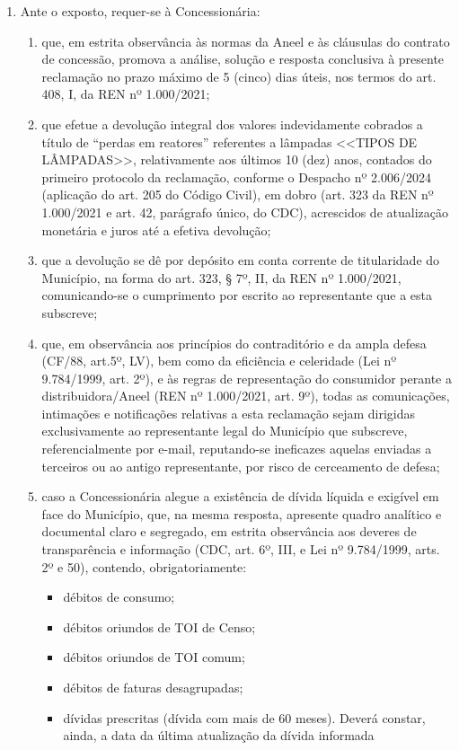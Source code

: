 \begin{enumerate}[resume]

\item
Ante o exposto, requer-se à Concessionária: 

\begin{enumerate}
    \item que, em estrita observância às normas da Aneel e às cláusulas do contrato de concessão, promova a análise, solução e resposta conclusiva à presente reclamação no prazo máximo de 5 (cinco) dias úteis, nos termos do art. 408, I, da REN nº 1.000/2021;
    \item  que efetue a devolução integral dos valores indevidamente cobrados a título de “perdas em reatores” referentes a lâmpadas <<TIPOS DE LÂMPADAS>>, relativamente aos últimos 10 (dez) anos, contados do primeiro protocolo da reclamação, conforme o Despacho nº 2.006/2024 (aplicação do art. 205 do Código Civil), em dobro (art. 323 da REN nº 1.000/2021 e art. 42, parágrafo único, do CDC), acrescidos de atualização monetária e juros até a efetiva devolução; 
    \item que a devolução se dê por depósito em conta corrente de titularidade do Município, na forma do art. 323, § 7º, II, da REN nº 1.000/2021, comunicando-se o cumprimento por escrito ao representante que a esta subscreve; 
    \item que, em observância aos princípios do contraditório e da ampla defesa (CF/88, art.5º, LV), bem como da eficiência e celeridade (Lei nº 9.784/1999, art. 2º), e às regras de representação do consumidor perante a distribuidora/Aneel (REN nº 1.000/2021, art. 9º), todas as comunicações, intimações e notificações relativas a esta reclamação sejam dirigidas exclusivamente ao representante legal do Município que subscreve, referencialmente por e-mail, reputando-se ineficazes aquelas enviadas a terceiros ou ao antigo representante, por risco de cerceamento de defesa;
    \item caso a Concessionária alegue a existência de dívida líquida e exigível em face do Município, que, na mesma resposta, apresente quadro analítico e documental claro e segregado, em estrita observância aos deveres de transparência e informação (CDC, art. 6º, III, e Lei nº 9.784/1999, arts. 2º e 50), contendo, obrigatoriamente: 
    \begin{itemize}
        \item débitos de consumo; 
        \item débitos oriundos de TOI de Censo;
        \item débitos oriundos de TOI comum; 
        \item débitos de faturas desagrupadas; 
        \item dívidas prescritas (dívida com mais de 60 meses). Deverá constar, ainda, a data da última atualização da dívida informada 
    \end{itemize}
\end{enumerate}


\end{enumerate}